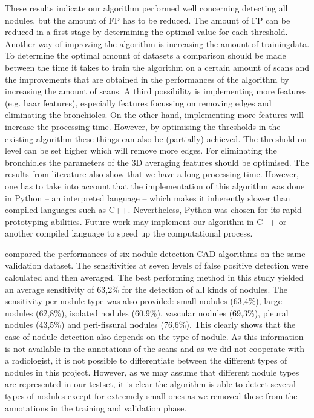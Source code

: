 These results indicate our algorithm performed well concerning detecting all
nodules, but the amount of FP has to be reduced. The amount of FP can be reduced
in a first stage by determining the optimal value for each threshold.
Another way of improving the algorithm is increasing the amount of trainingdata.
To determine the optimal amount of datasets a comparison should be made between
the time it takes to train the algorithm on a certain amount of scans and the
improvements that are obtained in the performances of the algorithm by
increasing the amount of scans. A third possibility is implementing more
features (e.g. haar features), especially features focussing on removing edges
and eliminating the bronchioles. On the other hand, implementing more features
will increase the processing time. However, by optimising the thresholds in the
existing algorithm these things can also be (partially) achieved. The threshold
on level can be set higher which will remove more edges. For eliminating the
bronchioles the parameters of the 3D averaging features should be optimised. The
results from literature also show that we have a long processing time. However,
one has to take into account that the implementation of this algorithm was done
in Python -- an interpreted language -- which makes it inherently slower than
compiled languages such as C++. Nevertheless, Python was chosen for its rapid
prototyping abilities. Future work may implement our algorithm in C++ or another
compiled language to speed up the computational process.


\cite{ginneken} compared the performances of six nodule detection CAD algorithms
on the same validation dataset. The sensitivities at seven levels of false
positive detection were calculated and then averaged. The best performing method
in this study yielded an average sensitivity of 63,2\% for the detection of all
kinds of nodules. The sensitivity per nodule type was also provided: small
nodules (63,4\%), large nodules (62,8\%), isolated nodules (60,9\%), vascular
nodules (69,3\%), pleural nodules (43,5\%) and peri-fissural nodules (76,6\%).
This clearly shows that the ease of nodule detection also depends on the type of
nodule. As this information is not available in the annotations of the scans and
as we did not cooperate with a radiologist, it is not possible to differentiate
between the different types of nodules in this project. However, as we may
assume that different nodule types are represented in our testset, it is clear
the algorithm is able to detect several types of nodules except for extremely
small ones as we removed these from the annotations in the training and
validation phase.





